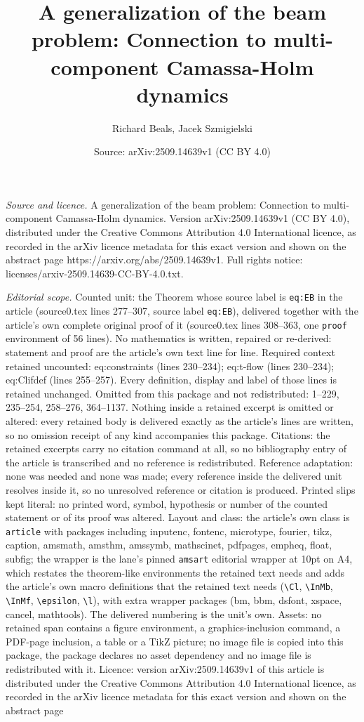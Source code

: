 \documentclass[10pt,a4paper]{amsart}
\title[A generalization of the beam problem: Connection to multi-co]{A generalization of the beam problem: Connection to multi-component Camassa-Holm dynamics}
\author{Richard Beals, Jacek Szmigielski}
\date{Source: arXiv:2509.14639v1 (CC BY 4.0)}
\begin{document}
\maketitle

\noindent\emph{Source and licence.} A generalization of the beam problem: Connection to multi-component Camassa-Holm dynamics. Version arXiv:2509.14639v1 (CC BY 4.0), distributed under the Creative Commons Attribution 4.0 International licence, as recorded in the arXiv licence metadata for this exact version and shown on the abstract page https://arxiv.org/abs/2509.14639v1. Full rights notice: licenses/arxiv-2509.14639-CC-BY-4.0.txt.\par\smallskip

\noindent\textit{Editorial scope.} Counted unit: the Theorem whose source label is \texttt{eq:EB} in the article (source0.tex lines 277--307, source label \texttt{eq:EB}), delivered together with the article's own complete original proof of it (source0.tex lines 308--363, one \texttt{proof} environment of 56 lines). No mathematics is written, repaired or re-derived: statement and proof are the article's own text line for line. Required context retained uncounted: eq:constraints (lines 230--234); eq:t-flow (lines 230--234); eq:Clifdef (lines 255--257). Every definition, display and label of those lines is retained unchanged. Omitted from this package and not redistributed: 1--229, 235--254, 258--276, 364--1137. Nothing inside a retained excerpt is omitted or altered: every retained body is delivered exactly as the article's lines are written, so no omission receipt of any kind accompanies this package. Citations: the retained excerpts carry no citation command at all, so no bibliography entry of the article is transcribed and no reference is redistributed. Reference adaptation: none was needed and none was made; every reference inside the delivered unit resolves inside it, so no unresolved reference or citation is produced. Printed slips kept literal: no printed word, symbol, hypothesis or number of the counted statement or of its proof was altered. Layout and class: the article's own class is \texttt{article} with packages including inputenc, fontenc, microtype, fourier, tikz, caption, amsmath, amsthm, amssymb, mathscinet, pdfpages, empheq, float, subfig; the wrapper is the lane's pinned \texttt{amsart} editorial wrapper at 10pt on A4, which restates the theorem-like environments the retained text needs and adds the article's own macro definitions that the retained text needs (\texttt{\textbackslash Cl}, \texttt{\textbackslash InMb}, \texttt{\textbackslash InMf}, \texttt{\textbackslash epsilon}, \texttt{\textbackslash l}), with extra wrapper packages (bm, bbm, dsfont, xspace, cancel, mathtools). The delivered numbering is the unit's own. Assets: no retained span contains a figure environment, a graphics-inclusion command, a PDF-page inclusion, a table or a TikZ picture; no image file is copied into this package, the package declares no asset dependency and no image file is redistributed with it. Licence: version arXiv:2509.14639v1 of this article is distributed under the Creative Commons Attribution 4.0 International licence, as recorded in the arXiv licence metadata for this exact version and shown on the abstract page 
\end{document}
